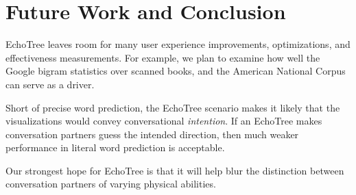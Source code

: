\documentclass{sigchi}
\begin{document}
\section{Future Work and Conclusion}
EchoTree leaves room for many user experience improvements,
optimizations, and effectiveness measurements. For example, we plan to
examine how well the Google bigram statistics over scanned books, and
the American National Corpus \cite{anc} can serve as a driver.

Short of precise word prediction, the EchoTree scenario makes it
likely that the visualizations would convey conversational {\em
  intention}. If an EchoTree makes conversation partners guess the
intended direction, then much weaker performance in literal word
prediction is acceptable.

Our strongest hope for EchoTree is that it will help blur the
distinction between conversation partners of varying physical
abilities. 



%
%
%
%
%
\balance


\scriptsize{}
\end{document}
